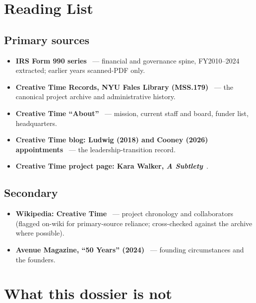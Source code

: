 \documentclass[10pt,letterpaper,twocolumn]{article}
\begin{document}
\section{Reading List}

\subsection{Primary sources}

\begin{itemize}
\item \textbf{IRS Form 990 series}~\citep{ctpropublica} --- financial and governance spine, FY2010--2024 extracted; earlier years scanned-PDF only.
\item \textbf{Creative Time Records, NYU Fales Library (MSS.179)}~\citep{ctfales} --- the canonical project archive and administrative history.
\item \textbf{Creative Time ``About''}~\citep{ctabout} --- mission, current staff and board, funder list, headquarters.
\item \textbf{Creative Time blog: Ludwig (2018) and Cooney (2026) appointments}~\citep{ctludwig2018,ctcooney2026} --- the leadership-transition record.
\item \textbf{Creative Time project page: Kara Walker, \emph{A Subtlety}}~\citep{ctkarawalker}.
\end{itemize}

\subsection{Secondary}

\begin{itemize}
\item \textbf{Wikipedia: Creative Time}~\citep{ctwiki} --- project chronology and collaborators (flagged on-wiki for primary-source reliance; cross-checked against the archive where possible).
\item \textbf{Avenue Magazine, ``50 Years'' (2024)}~\citep{ct50avenue} --- founding circumstances and the founders.
\end{itemize}

\section{What this dossier is not}
\end{document}
